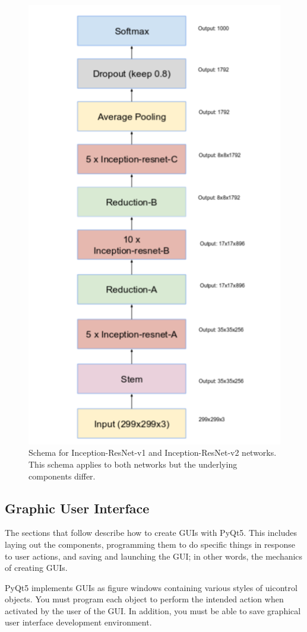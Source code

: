 \documentclass[journal, twocolumn]{IEEEtran}
\begin{document}
\begin{figure}
    \centering
    \includegraphics[width=0.7\linewidth]{img/in_res_v1.png}
	\caption{Schema for Inception-ResNet-v1 and Inception-ResNet-v2 networks. This schema applies to both networks but the underlying components differ.}
	\label{fig:inception-resnet}
\end{figure}


\subsection{Graphic User Interface}
\label{gui}

The sections that follow describe how to create GUIs with PyQt5. This includes laying out the components, programming them to do specific things in response to user actions, and saving and launching the GUI; in other words, the mechanics of creating GUIs.

PyQt5 implements GUIs as figure windows containing various styles of uicontrol objects. You must program each object to perform the intended action when activated by the user of the GUI. In addition, you must be able to save graphical user interface development environment.
\end{document}
